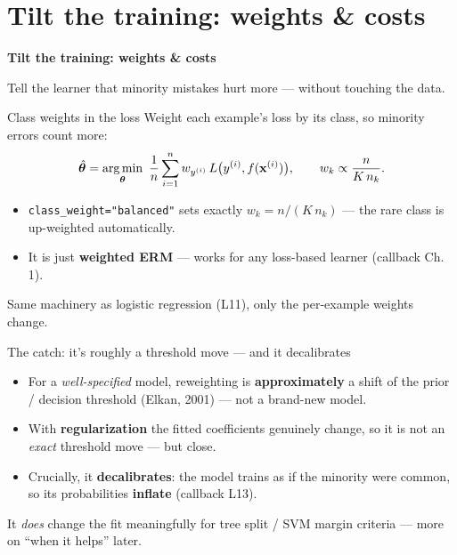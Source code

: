 \documentclass[aspectratio=169]{beamer}
\begin{document}
\section{Tilt the training: weights \& costs}

\begin{frame}[plain]
  \vfill
  \begin{center}
    {\Large\color{popblue}\textbf{Tilt the training: weights \& costs}}\\[0.9em]
    \begin{minipage}{0.82\textwidth}\centering\small
      Tell the learner that minority mistakes hurt more --- without touching the data.
    \end{minipage}
  \end{center}
  \vfill
\end{frame}

\begin{frame}{Class weights in the loss}
  Weight each example's loss by its class, so minority errors count more:
  \[
    \hat{\bm{\theta}} = \mathop{\mathrm{arg\,min}}_{\bm{\theta}} \ \frac1n \sum_{i=1}^{n} w_{y^{(i)}}\, L\big(y^{(i)}, f(\mathbf{x}^{(i)})\big),
    \qquad w_k \propto \frac{n}{K\, n_k}.
  \]
  \begin{itemize}\small
    \item \texttt{class\_weight="balanced"} sets exactly $w_k = n/(K\,n_k)$ --- the rare class is
      up-weighted automatically.
    \item It is just \textbf{weighted ERM} --- works for any loss-based learner (callback Ch.\,1).
  \end{itemize}
  \vfill
  \footnotesize Same machinery as logistic regression (L11), only the per-example weights change.
\end{frame}

\begin{frame}{The catch: it's roughly a threshold move --- and it decalibrates}
  \begin{itemize}\small
    \item For a \emph{well-specified} model, reweighting is \textbf{approximately} a shift of the
      prior / decision threshold (Elkan, 2001) --- not a brand-new model.
    \item With \textbf{regularization} the fitted coefficients genuinely change, so it is not an
      \emph{exact} threshold move --- but close.
    \item Crucially, it \textbf{decalibrates}: the model trains as if the minority were common, so
      its probabilities \textbf{inflate} (callback L13).
  \end{itemize}
  \vfill
  \vskip 3pt
  \footnotesize It \emph{does} change the fit meaningfully for tree split / SVM margin criteria --- more on ``when it helps'' later.
\end{frame}
\end{document}
